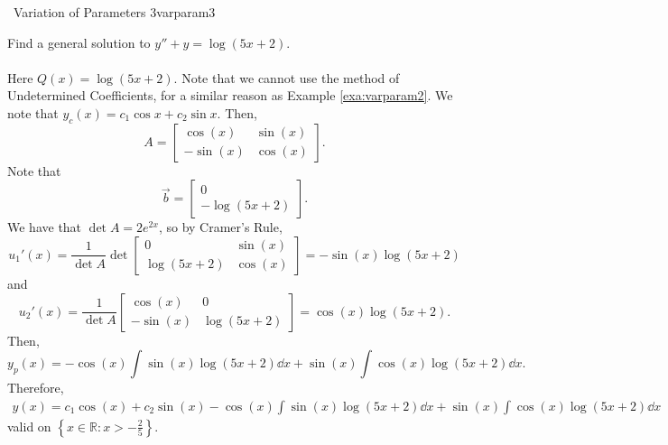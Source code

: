         \begin{example}{\Difficulty\,\Difficulty\,\,Variation of Parameters 3}{varparam3}

            Find a general solution to \(y''+y=\log(5x+2)\). 
            \\
            \\
            Here \(Q(x)=\log(5x+2)\). Note that we cannot use the method of Undetermined Coefficients, for a similar reason as Example \ref{exa:varparam2}. We note that \(y_c(x)=c_1\cos x+c_2\sin x\). Then,
            \begin{equation*}
                A=\begin{bmatrix}
                    \cos(x) & \sin(x) \\
                    -\sin(x) & \cos(x)
                \end{bmatrix}.
            \end{equation*}
            Note that
            \begin{equation*}
                \vec{b}=\begin{bmatrix} 0 \\ -\log(5x+2) \end{bmatrix}.
            \end{equation*}
            We have that \(\det A=2e^{2x}\), so by Cramer's Rule,
            \begin{equation*}
                u_1'(x)=\frac{1}{\det A}\det\begin{bmatrix}
                    0 & \sin(x) \\
                    \log(5x+2) & \cos(x)
                \end{bmatrix}=-\sin(x)\log(5x+2)
            \end{equation*}
            and
            \begin{equation*}
                u_2'(x)=\frac{1}{\det A}\begin{bmatrix}
                    \cos(x) & 0 \\
                    -\sin(x) & \log(5x+2)
                \end{bmatrix}=\cos(x)\log(5x+2).
            \end{equation*}
            Then,
            \begin{equation*}
                y_p(x)=-\cos(x)\int \sin(x)\log(5x+2)\dd x+\sin(x)\int \cos(x)\log(5x+2) \dd x.
            \end{equation*}
            Therefore,
            \begin{align*}
                y(x)=c_1\cos(x)+c_2\sin(x)-\cos(x)\int \sin(x)\log(5x+2)\dd x+\sin(x)\int \cos(x)\log(5x+2) \dd x
            \end{align*}
            valid on \(\left\{x\in\mathbb{R}:x>-\frac{2}{5}\right\}\).
            
        \end{example}

